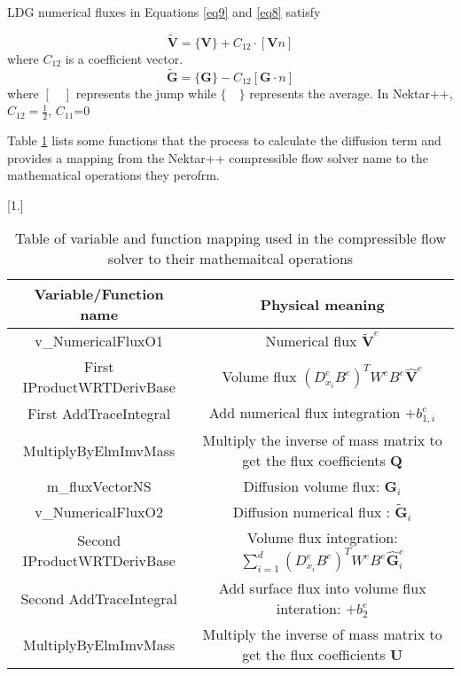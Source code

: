 LDG numerical fluxes in Equations \eqref{eq9} and \eqref{eq8} satisfy

\begin{equation}
\tilde{\textbf{V}}=\{\textbf{V}\}+C_{12}\cdot [\textbf{V} n]
\end{equation}
where $C_{12}$ is a coefficient vector.
\begin{equation}
\tilde{\textbf{G}}=\{\textbf{G}\}-C_{12} [\textbf{G} \cdot n]
\end{equation}
where $[\quad]$ represents the jump while $\{\quad \}$ represents the average. In Nektar++, $C_{12}=\frac{1}{2}$, $C_{11}$=0


Table \ref{table3} lists some functions that the process to calculate the diffusion term and provides a mapping from the Nektar++ compressible flow solver name to the mathematical operations they perofrm.
\begin {table}[h]
\caption {Table of variable and function mapping used in the compressible flow solver to their mathemaitcal operations} \label{table3} 
\begin{center}
\scalebox{0.9}[1.]{
\begin{tabular}{ | c | c|}
\hline      
Variable/Function name & Physical meaning \\  
\hline
v\_NumericalFluxO1  &  Numerical flux $\tilde{\textbf{V}}^{e}$ \\
\hline
First IProductWRTDerivBase & Volume flux $(D^{e}_{x_{i}} B^{e})^{T}W^{e}B^{e}\hat{\textbf{V}}^{e}$\\
\hline
First AddTraceIntegral& Add numerical flux integration $+b_{1,i}^{e}$ \\
\hline
MultiplyByElmImvMass& Multiply the inverse of mass matrix to get the flux coefficients $\textbf{Q}$\\
\hline
m\_fluxVectorNS  & Diffusion volume flux: $\textbf{G}_{i}$\\
\hline
v\_NumericalFluxO2 & Diffusion numerical flux : $\widetilde{\textbf{G}}_{i}$\\
 \hline
Second IProductWRTDerivBase &  Volume flux integration: $\sum\limits_{i=1}^{d}{(D^{e}_{x_{i}} B^{e})^{T}}W^{e}B^{e}\hat{\textbf{G}}^{e}_{i}$ \\
 \hline
Second AddTraceIntegral &  Add surface flux into volume flux interation: $+b_{2}^{e}$\\ 
\hline
MultiplyByElmImvMass& Multiply the inverse of mass matrix to get the flux coefficients $\hat{\textbf{U}}$\\
\hline
\end{tabular}
}
\end{center}
\end{table}







